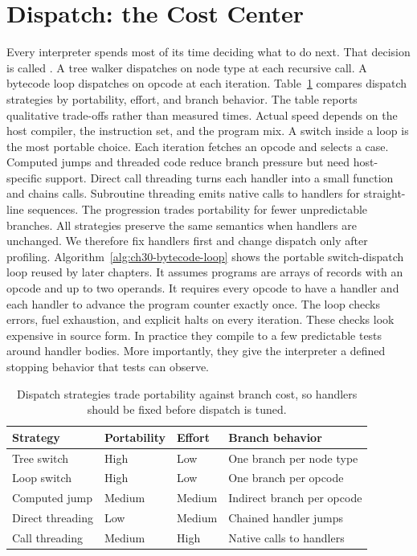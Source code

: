 \section{Dispatch: the Cost Center}\label{sec:ch30-dispatch}

Every interpreter spends most of its time deciding what to do next.
That decision is called .
A tree walker dispatches on node type at each recursive call.
A bytecode loop dispatches on opcode at each iteration.
Table~\ref{tab:ch30-dispatch} compares dispatch strategies by portability, effort, and branch behavior.
The table reports qualitative trade-offs rather than measured times.
Actual speed depends on the host compiler, the instruction set, and the program mix.
A switch inside a loop is the most portable choice.
Each iteration fetches an opcode and selects a case.
Computed jumps and threaded code reduce branch pressure but need host-specific support.
Direct call threading turns each handler into a small function and chains calls.
Subroutine threading emits native calls to handlers for straight-line sequences.
The progression trades portability for fewer unpredictable branches.
All strategies preserve the same semantics when handlers are unchanged.
We therefore fix handlers first and change dispatch only after profiling.
Algorithm~\ref{alg:ch30-bytecode-loop} shows the portable switch-dispatch loop reused by later chapters.
It assumes programs are arrays of records with an opcode and up to two operands.
It requires every opcode to have a handler and each handler to advance the program counter exactly once.
The loop checks errors, fuel exhaustion, and explicit halts on every iteration.
These checks look expensive in source form.
In practice they compile to a few predictable tests around handler bodies.
More importantly, they give the interpreter a defined stopping behavior that tests can observe.

\begin{table}[htbp]
\centering
\caption{Dispatch strategies trade portability against branch cost, so handlers should be fixed before dispatch is tuned.}
\label{tab:ch30-dispatch}
\begin{tabular}{llll}
\toprule
Strategy & Portability & Effort & Branch behavior \\
\midrule
Tree switch & High & Low & One branch per node type \\
Loop switch & High & Low & One branch per opcode \\
Computed jump & Medium & Medium & Indirect branch per opcode \\
Direct threading & Low & Medium & Chained handler jumps \\
Call threading & Medium & High & Native calls to handlers \\
\bottomrule
\end{tabular}
\end{table}

